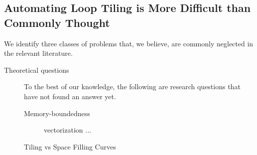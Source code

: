 
\subsection{Automating Loop Tiling is More Difficult than Commonly Thought}
We identify three classes of problems that, we believe, are commonly neglected in the relevant literature. 

\begin{description}
\item[Theoretical questions] To the best of our knowledge, the following are research questions that have not found an answer yet. 
\begin{description}
\item[Memory-boundedness] vectorization ...
\item[Tiling vs Space Filling Curves]
\end{description}


\end{description}

